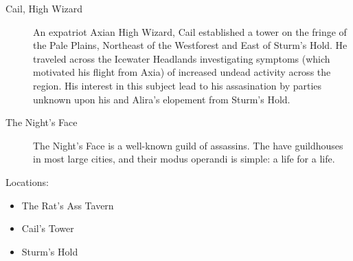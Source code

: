\documentclass[11pt]{article}
\theoremstyle{definition}
\theoremstyle{remark}
\begin{document}
\begin{description}
\begin{description}
\item[Cail, High Wizard]

An expatriot Axian High Wizard, Cail established a tower on the fringe of the Pale Plains, Northeast of the Westforest and East of Sturm's Hold.  He traveled across the Icewater Headlands investigating symptoms (which motivated his flight from Axia) of increased undead activity across the region. His interest in this subject lead to his assasination by parties unknown upon his and Alira's elopement from Sturm's Hold.

\item[The Night's Face]

The Night's Face is a well-known guild of assassins. The have guildhouses in most large cities, and their modus operandi is simple: a life for a life.

\end{description}

\item{Locations:}

\begin{itemize}

\item{ The Rat's Ass Tavern }

\item{ Cail's Tower }

\item{ Sturm's Hold }

\end{itemize}

\end{description}
\end{document}
